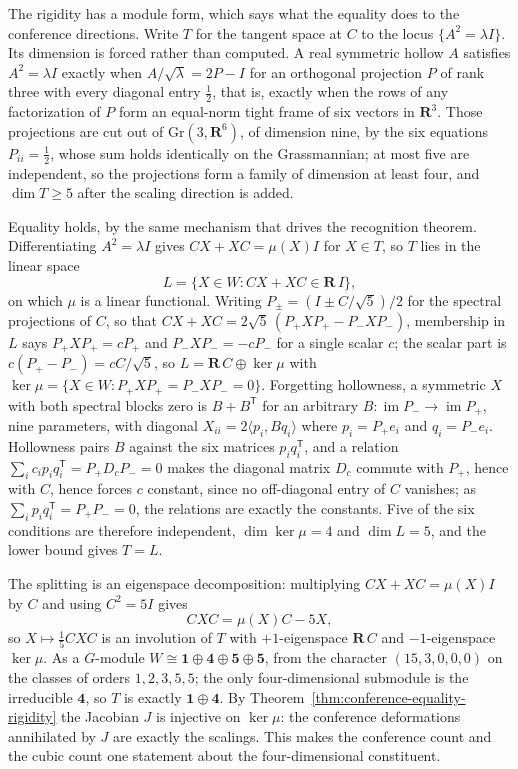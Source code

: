 The rigidity has a module form, which says what the equality does to the
conference directions.  Write \(T\) for the tangent space at \(C\) to the locus
\(\{A^2=\lambda I\}\).  Its dimension is forced rather than computed.  A real
symmetric hollow \(A\) satisfies \(A^2=\lambda I\) exactly when
\(A/\sqrt\lambda=2P-I\) for an orthogonal projection \(P\) of rank three with
every diagonal entry \(\tfrac12\), that is, exactly when the rows of any
factorization of \(P\) form an equal-norm tight frame of six vectors in
\(\mathbf R^3\).  Those projections are cut out of \(\mathrm{Gr}(3,\mathbf R^6)\),
of dimension nine, by the six equations \(P_{ii}=\tfrac12\), whose sum holds
identically on the Grassmannian; at most five are independent, so the projections
form a family of dimension at least four, and \(\dim T\ge5\) after the scaling
direction is added.

Equality holds, by the same mechanism that drives the recognition theorem.
Differentiating \(A^2=\lambda I\) gives \(CX+XC=\mu(X)I\) for \(X\in T\), so
\(T\) lies in the linear space
\[
 L=\{X\in W:CX+XC\in\mathbf R\,I\},
\]
on which \(\mu\) is a linear functional.  Writing \(P_\pm=(I\pm C/\sqrt5)/2\)
for the spectral projections of \(C\), so that
\(CX+XC=2\sqrt5\,(P_+XP_+-P_-XP_-)\), membership in \(L\) says
\(P_+XP_+=cP_+\) and \(P_-XP_-=-cP_-\) for a single scalar \(c\); the scalar
part is \(c(P_+-P_-)=cC/\sqrt5\), so \(L=\mathbf R\,C\oplus\ker\mu\) with
\(\ker\mu=\{X\in W:P_+XP_+=P_-XP_-=0\}\).  Forgetting hollowness, a symmetric
\(X\) with both spectral blocks zero is \(B+B^{\mathsf T}\) for an arbitrary
\(B\colon\operatorname{im}P_-\to\operatorname{im}P_+\), nine parameters, with
diagonal \(X_{ii}=2\langle p_i,Bq_i\rangle\) where \(p_i=P_+e_i\) and
\(q_i=P_-e_i\).  Hollowness pairs \(B\) against the six matrices
\(p_iq_i^{\mathsf T}\), and a relation
\(\sum_ic_ip_iq_i^{\mathsf T}=P_+D_cP_-=0\) makes the diagonal matrix \(D_c\)
commute with \(P_+\), hence with \(C\), hence forces \(c\) constant, since no
off-diagonal entry of \(C\) vanishes; as \(\sum_ip_iq_i^{\mathsf T}=P_+P_-=0\),
the relations are exactly the constants.  Five of the six conditions are
therefore independent, \(\dim\ker\mu=4\) and \(\dim L=5\), and the lower bound
gives \(T=L\).

The splitting is an eigenspace decomposition: multiplying \(CX+XC=\mu(X)I\)
by \(C\) and using \(C^2=5I\) gives
\[
 CXC=\mu(X)C-5X,
\]
so \(X\mapsto\tfrac15CXC\) is an involution of \(T\) with \(+1\)-eigenspace
\(\mathbf R\,C\) and \(-1\)-eigenspace \(\ker\mu\).  As a \(G\)-module
\(W\cong\mathbf1\oplus\mathbf4\oplus\mathbf5\oplus\mathbf5\), from the
character \((15,3,0,0,0)\) on the classes of orders \(1,2,3,5,5\); the only
four-dimensional submodule is the irreducible \(\mathbf4\), so \(T\) is
exactly \(\mathbf1\oplus\mathbf4\).  By
Theorem~\ref{thm:conference-equality-rigidity} the Jacobian \(J\) is injective on
\(\ker\mu\): the conference deformations annihilated by \(J\) are exactly
the scalings.  This makes the conference count and the cubic count one
statement about the four-dimensional constituent.

